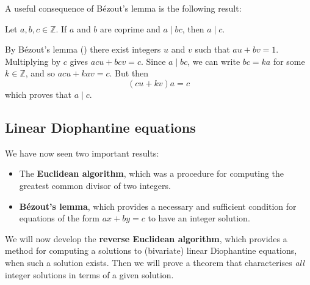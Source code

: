 A useful consequence of B\'{e}zout's lemma is the following result:

\begin{proposition}
\label{propADividesBC}
Let $a,b,c \in \mathbb{Z}$. If $a$ and $b$ are coprime and $a \mid bc$, then $a \mid c$.
\end{proposition}

\begin{cproof}
By B\'{e}zout's lemma () there exist integers $u$ and $v$ such that $au+bv=1$. Multiplying by $c$ gives $acu+bcv=c$. Since $a \mid bc$, we can write $bc=ka$ for some $k \in \mathbb{Z}$, and so $acu+kav=c$. But then \[ (cu+kv)a = c \] which proves that $a \mid c$.
\end{cproof}

\subsection*{Linear Diophantine equations}
We have now seen two important results:
\begin{itemize}
\item The \textbf{Euclidean algorithm}, which was a procedure for computing the greatest common divisor of two integers.
\item \textbf{B\'{e}zout's lemma}, which provides a necessary and sufficient condition for equations of the form $ax+by=c$ to have an integer solution.
\end{itemize}
We will now develop the \textbf{reverse Euclidean algorithm}, which provides a method for computing a solutions to (bivariate) linear Diophantine equations, when such a solution exists. Then we will prove a theorem that characterises \textit{all} integer solutions in terms of a given solution.


